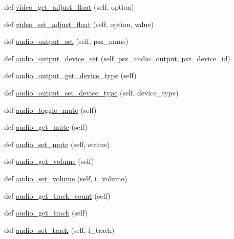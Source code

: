 \begin{DoxyCompactItemize}
\item 
def \hyperlink{classsrc_1_1lib_1_1vlc_1_1MediaPlayer_aee153744de9aac1b686184d02c402db4}{video\+\_\+get\+\_\+adjust\+\_\+float} (self, option)
\item 
def \hyperlink{classsrc_1_1lib_1_1vlc_1_1MediaPlayer_ad0893c8a3c79d2377244f608f5091a45}{video\+\_\+set\+\_\+adjust\+\_\+float} (self, option, value)
\item 
def \hyperlink{classsrc_1_1lib_1_1vlc_1_1MediaPlayer_a96735b3d7444f9018f45f158c5ce42de}{audio\+\_\+output\+\_\+set} (self, psz\+\_\+name)
\item 
def \hyperlink{classsrc_1_1lib_1_1vlc_1_1MediaPlayer_a526016c7a9e802add4c9525ee051f987}{audio\+\_\+output\+\_\+device\+\_\+set} (self, psz\+\_\+audio\+\_\+output, psz\+\_\+device\+\_\+id)
\item 
def \hyperlink{classsrc_1_1lib_1_1vlc_1_1MediaPlayer_afdccfdba863c90215f364bd9cb619fcf}{audio\+\_\+output\+\_\+get\+\_\+device\+\_\+type} (self)
\item 
def \hyperlink{classsrc_1_1lib_1_1vlc_1_1MediaPlayer_af10a397794978994b1dca66fefee1908}{audio\+\_\+output\+\_\+set\+\_\+device\+\_\+type} (self, device\+\_\+type)
\item 
def \hyperlink{classsrc_1_1lib_1_1vlc_1_1MediaPlayer_af74f201325b034bc7de5977fd4d961eb}{audio\+\_\+toggle\+\_\+mute} (self)
\item 
def \hyperlink{classsrc_1_1lib_1_1vlc_1_1MediaPlayer_ad0f49a147170b1da112c81aa6e451ac7}{audio\+\_\+get\+\_\+mute} (self)
\item 
def \hyperlink{classsrc_1_1lib_1_1vlc_1_1MediaPlayer_a7bb1cf24493f2580d8be6da8584fcc79}{audio\+\_\+set\+\_\+mute} (self, status)
\item 
def \hyperlink{classsrc_1_1lib_1_1vlc_1_1MediaPlayer_a56c8572976bc0d0e68ca845b396c29ec}{audio\+\_\+get\+\_\+volume} (self)
\item 
def \hyperlink{classsrc_1_1lib_1_1vlc_1_1MediaPlayer_a3f8c641909a12a370ff4702140c1b7d5}{audio\+\_\+set\+\_\+volume} (self, i\+\_\+volume)
\item 
def \hyperlink{classsrc_1_1lib_1_1vlc_1_1MediaPlayer_ade4b7e75fed65a8ecb3978977f81589e}{audio\+\_\+get\+\_\+track\+\_\+count} (self)
\item 
def \hyperlink{classsrc_1_1lib_1_1vlc_1_1MediaPlayer_af6c2de5e0ee6e56f4adc4df260adc5c9}{audio\+\_\+get\+\_\+track} (self)
\item 
def \hyperlink{classsrc_1_1lib_1_1vlc_1_1MediaPlayer_a96e2016d78722de5112adaf5a15e1a00}{audio\+\_\+set\+\_\+track} (self, i\+\_\+track)

\end{DoxyCompactItemize}
